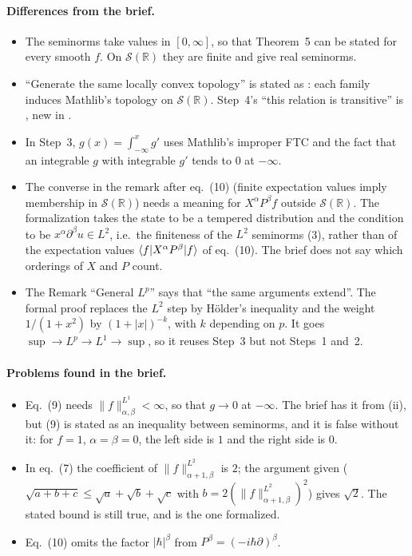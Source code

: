 \documentclass[11pt]{article}
\begin{document}
\paragraph{Differences from the brief.}
\begin{itemize}
\item The seminorms take values in $[0, \infty]$, so that Theorem~5 can be stated for every
  smooth $f$. On $\mathcal{S}(\mathbb{R})$ they are finite and give real seminorms.
\item ``Generate the same locally convex topology'' is stated as : each
  family induces Mathlib's topology on $\mathcal{S}(\mathbb{R})$. Step~4's ``this relation is
  transitive'' is , new in .
\item In Step~3, $g(x) = \int_{-\infty}^x g'$ uses Mathlib's improper FTC and the fact that an
  integrable $g$ with integrable $g'$ tends to $0$ at $-\infty$.
\item The converse in the remark after eq.~(10) (finite expectation values imply membership in
  $\mathcal{S}(\mathbb{R})$) needs a meaning for $X^\alpha P^\beta f$ outside
  $\mathcal{S}(\mathbb{R})$. The formalization takes the state to be a tempered distribution and
  the condition to be $x^\alpha \partial^\beta u \in L^2$, i.e.\ the finiteness of the $L^2$
  seminorms (3), rather than of the expectation values $\braket{f|X^\alpha P^\beta|f}$ of
  eq.~(10). The brief does not say which orderings of $X$ and $P$ count.
\item The Remark ``General $L^p$'' says that ``the same arguments extend''. The formal proof
  replaces the $L^2$ step by Hölder's inequality and the weight $1/(1+x^2)$ by
  $(1+|x|)^{-k}$, with $k$ depending on $p$. It goes $\sup \to L^p \to L^1 \to \sup$, so it
  reuses Step~3 but not Steps~1 and~2.
\end{itemize}

\paragraph{Problems found in the brief.}
\begin{itemize}
\item Eq.~(9) needs $\|f\|^{L^1}_{\alpha,\beta} < \infty$, so that $g \to 0$ at $-\infty$. The
  brief has it from (ii), but (9) is stated as an inequality between seminorms, and it is false
  without it: for $f = 1$, $\alpha = \beta = 0$, the left side is $1$ and the right side is $0$.
\item In eq.~(7) the coefficient of $\|f\|^{L^2}_{\alpha+1,\beta}$ is $2$; the argument given
  ($\sqrt{a+b+c} \le \sqrt a + \sqrt b + \sqrt c$ with $b = 2(\|f\|^{L^2}_{\alpha+1,\beta})^2$)
  gives $\sqrt 2$. The stated bound is still true, and is the one formalized.
\item Eq.~(10) omits the factor $|\hbar|^\beta$ from $P^\beta = (-i\hbar\partial)^\beta$.
\end{itemize}
\end{document}
